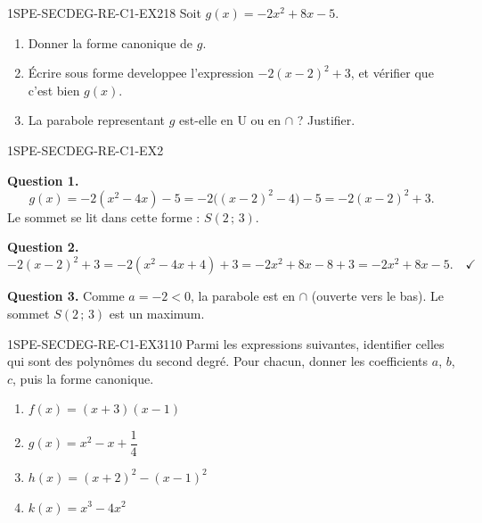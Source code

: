 
\begin{exercice}{1SPE-SECDEG-RE-C1-EX2}{1}{8}
Soit $g(x) = -2x^2 + 8x - 5$.
\begin{enumerate}
  \item Donner la forme canonique de $g$.
  \item Écrire sous forme developpee l'expression $-2(x - 2)^2 + 3$, et vérifier que c'est bien $g(x)$.
  \item La parabole representant $g$ est-elle en U ou en $\cap$ ? Justifier.
\end{enumerate}
\end{exercice}



\begin{corrige}{1SPE-SECDEG-RE-C1-EX2}


\textbf{Question 1.}
\[
 g(x)=-2(x^2-4x)-5=-2\bigl((x-2)^2-4\bigr)-5=-2(x-2)^2+3.
\]
Le sommet se lit dans cette forme : $S(2\,;\,3)$.

\textbf{Question 2.}
\[
-2(x-2)^2 + 3 = -2(x^2 - 4x + 4) + 3 = -2x^2 + 8x - 8 + 3 = -2x^2 + 8x - 5. \quad \checkmark
\]


\textbf{Question 3.} Comme $a = -2 < 0$, la parabole est en $\cap$ (ouverte vers le bas). Le sommet $S(2\,;\,3)$ est un maximum.

\end{corrige}


\begin{exercice}{1SPE-SECDEG-RE-C1-EX3}{1}{10}
Parmi les expressions suivantes, identifier celles qui sont des polynômes du second degré. Pour chacun, donner les coefficients $a$, $b$, $c$, puis la forme canonique.
\begin{enumerate}
  \item $f(x) = (x+3)(x-1)$
  \item $g(x) = x^2 - x + \dfrac{1}{4}$
  \item $h(x) = (x+2)^2 - (x-1)^2$
  \item $k(x) = x^3 - 4x^2$
\end{enumerate}
\end{exercice}

